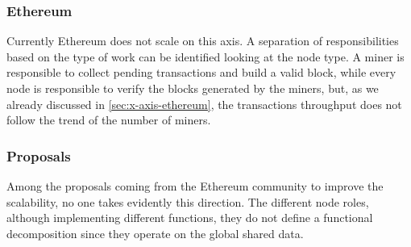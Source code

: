 \subsubsection{Ethereum}
Currently Ethereum does not scale on this axis. A separation of responsibilities
based on the type of work can be identified looking at the node type. A miner is
responsible to collect pending transactions and build a valid block, while every
node is responsible to verify the blocks generated by the miners, but, as we
already discussed in \autoref{sec:x-axis-ethereum}, the transactions throughput
does not follow the trend of the number of miners.


\subsubsection{Proposals}
Among the proposals coming from the Ethereum community to improve the
scalability, no one takes evidently this direction. The different node roles,
although implementing different functions, they do not define a functional
decomposition since they operate on the global shared data.
